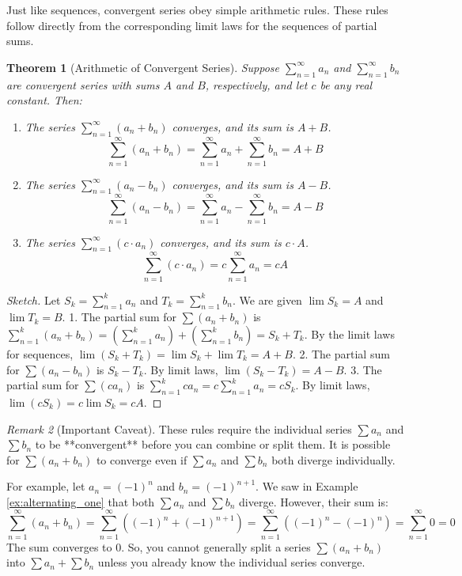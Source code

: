 \documentclass[11pt]{article}
\newtheorem{theorem}{Theorem}[section]
\theoremstyle{definition}
\theoremstyle{remark}
\newtheorem{remark}[theorem]{Remark}
\begin{document}
Just like sequences, convergent series obey simple arithmetic rules. These rules follow directly from the corresponding limit laws for the sequences of partial sums.

\begin{theorem}[Arithmetic of Convergent Series]
Suppose $\sum_{n=1}^{\infty} a_n$ and $\sum_{n=1}^{\infty} b_n$ are convergent series with sums $A$ and $B$, respectively, and let $c$ be any real constant. Then:
\begin{enumerate}
    \item The series $\sum_{n=1}^{\infty} (a_n + b_n)$ converges, and its sum is $A + B$.
    \[ \sum_{n=1}^{\infty} (a_n + b_n) = \sum_{n=1}^{\infty} a_n + \sum_{n=1}^{\infty} b_n = A + B \]
    \item The series $\sum_{n=1}^{\infty} (a_n - b_n)$ converges, and its sum is $A - B$.
    \[ \sum_{n=1}^{\infty} (a_n - b_n) = \sum_{n=1}^{\infty} a_n - \sum_{n=1}^{\infty} b_n = A - B \]
    \item The series $\sum_{n=1}^{\infty} (c \cdot a_n)$ converges, and its sum is $c \cdot A$.
    \[ \sum_{n=1}^{\infty} (c \cdot a_n) = c \sum_{n=1}^{\infty} a_n = c A \]
\end{enumerate}
\end{theorem}

\begin{proof}[Sketch]
Let $S_k = \sum_{n=1}^k a_n$ and $T_k = \sum_{n=1}^k b_n$. We are given $\lim S_k = A$ and $\lim T_k = B$.
1. The partial sum for $\sum (a_n + b_n)$ is $\sum_{n=1}^k (a_n + b_n) = (\sum_{n=1}^k a_n) + (\sum_{n=1}^k b_n) = S_k + T_k$. By the limit laws for sequences, $\lim (S_k + T_k) = \lim S_k + \lim T_k = A + B$.
2. The partial sum for $\sum (a_n - b_n)$ is $S_k - T_k$. By limit laws, $\lim (S_k - T_k) = A - B$.
3. The partial sum for $\sum (c a_n)$ is $\sum_{n=1}^k c a_n = c \sum_{n=1}^k a_n = c S_k$. By limit laws, $\lim (c S_k) = c \lim S_k = c A$.
\end{proof}

\begin{remark}[Important Caveat]
These rules require the individual series $\sum a_n$ and $\sum b_n$ to be **convergent** before you can combine or split them. It is possible for $\sum (a_n + b_n)$ to converge even if $\sum a_n$ and $\sum b_n$ both diverge individually.

For example, let $a_n = (-1)^n$ and $b_n = (-1)^{n+1}$. We saw in Example \ref{ex:alternating_one} that both $\sum a_n$ and $\sum b_n$ diverge. However, their sum is:
\[ \sum_{n=1}^{\infty} (a_n + b_n) = \sum_{n=1}^{\infty} ((-1)^n + (-1)^{n+1}) = \sum_{n=1}^{\infty} ((-1)^n - (-1)^n) = \sum_{n=1}^{\infty} 0 = 0 \]
The sum converges to 0. So, you cannot generally split a series $\sum(a_n+b_n)$ into $\sum a_n + \sum b_n$ unless you already know the individual series converge.
\end{remark}
\end{document}
